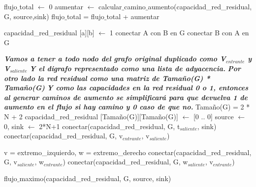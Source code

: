 \begin{algorithmic}
	\State flujo$\_$total $\leftarrow$ 0
	\Repeat 
			\State aumentar $\leftarrow$ calcular$\_$camino$\_$aumento(capacidad_red_residual, G, source,sink)
			\State flujo$\_$total = flujo$\_$total + aumentar
	
\EndFunction
\end{algorithmic}
\hspace{1cm}

\begin{algorithmic}
	\State capacidad_red_residual [a][b] $\leftarrow$ 1
	\State conectar A con B en G
	\State conectar B con A en G
\EndFunction
\end{algorithmic}
\hspace{1cm}

\begin{algorithmic}
	\State \textit{\textbf{Vamos a tener a todo nodo del grafo original duplicado como V$_{entrante}$ y V$_{saliente}$}}
	\State \textit{\textbf{Y el digrafo representado como una lista de adyacencia.}}
	\State \textit{\textbf{Por otro lado la red residual como una matriz de Tamaño(G) * Tamaño(G)}}
	\State \textit{\textbf{Y como las capacidades en la red residual 0 o 1, entonces al generar caminos de aumento se simplificará para que devuelva 1 de aumento en el flujo si hay camino y 0 caso de que no.}}
	\State Tamaño(G) = 2 * N + 2
	\State capacidad_red_residual [Tamaño(G)][Tamaño(G)] $\leftarrow$ [0 .. 0] 
	\State source $\leftarrow$ 0, sink $\leftarrow$ 2*N+1
			\State conectar(capacidad_red_residual, G, t$_{saliente}$, sink) 
		\EndIf
	\EndFor
		\State conectar(capacidad_red_residual, G, v$_{entrante}$, v$_{saliente}$)
	\EndFor

		\State v = extremo_izquierdo, w = extremo_derecho
		\State conectar(capacidad_red_residual, G, v$_{saliente}$, w$_{entrante}$)
		\State conectar(capacidad_red_residual, G, w$_{saliente}$, v$_{entrante}$)
	\EndFor
	
	\Return flujo$\_$maximo(capacidad_red_residual, G, source, sink)

\EndFunction

\end{algorithmic}



